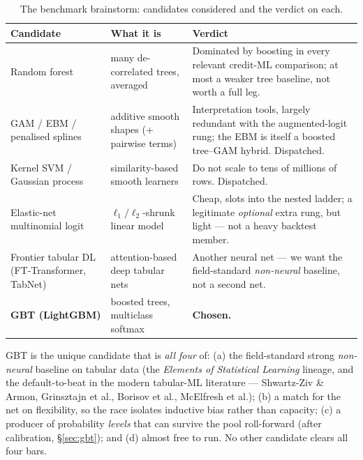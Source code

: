 \documentclass[11pt]{article}
\begin{document}
\begin{table}[H]
\centering
\caption{The benchmark brainstorm: candidates considered and the verdict on each.}
\vspace{2pt}
\small
\begin{tabular}{>{\raggedright\arraybackslash}p{3.3cm} >{\raggedright\arraybackslash}p{5.2cm} >{\raggedright\arraybackslash}p{5.2cm}}
\toprule
\textbf{Candidate} & \textbf{What it is} & \textbf{Verdict} \\
\midrule
Random forest & many de-correlated trees, averaged & Dominated by boosting in every relevant credit-ML comparison; at most a weaker tree baseline, not worth a full leg. \\
GAM / EBM / penalised splines & additive smooth shapes ($+$ pairwise terms) & Interpretation tools, largely redundant with the augmented-logit rung; the EBM is itself a boosted tree--GAM hybrid. Dispatched. \\
Kernel SVM / Gaussian process & similarity-based smooth learners & Do not scale to tens of millions of rows. Dispatched. \\
Elastic-net multinomial logit & $\ell_1/\ell_2$-shrunk linear model & Cheap, slots into the nested ladder; a legitimate \emph{optional} extra rung, but light --- not a heavy backtest member. \\
Frontier tabular DL (FT-Transformer, TabNet) & attention-based deep tabular nets & Another neural net --- we want the field-standard \emph{non-neural} baseline, not a second net. \\
\textbf{GBT (LightGBM)} & boosted trees, multiclass softmax & \textbf{Chosen.} \\
\bottomrule
\end{tabular}
\end{table}

\begin{keyidea}
GBT is the unique candidate that is \emph{all four} of: (a) the field-standard strong
\emph{non-neural} baseline on tabular data (the \emph{Elements of Statistical Learning} lineage,
and the default-to-beat in the modern tabular-ML literature --- Shwartz-Ziv \& Armon,
Grinsztajn et al., Borisov et al., McElfresh et al.); (b) a match for the net on flexibility, so
the race isolates inductive bias rather than capacity; (c) a producer of probability
\emph{levels} that can survive the pool roll-forward (after calibration, §\ref{sec:gbt}); and
(d) almost free to run. No other candidate clears all four bars.
\end{keyidea}
\end{document}
